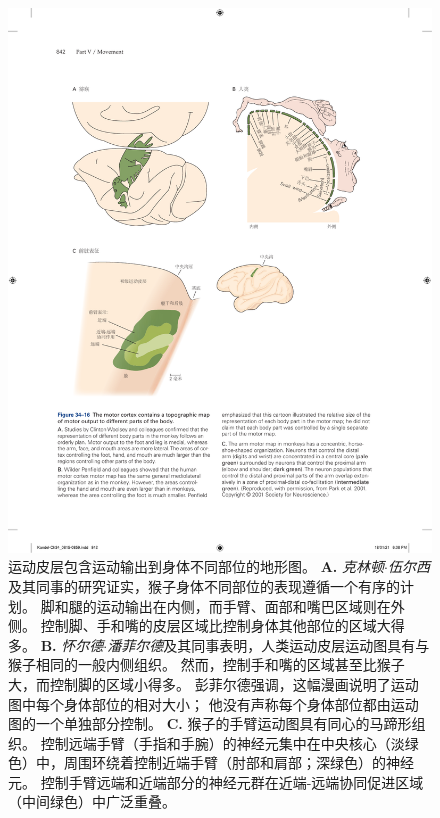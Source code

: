 \begin{figure}[htbp]
	\centering
	\includegraphics[width=1.0\linewidth]{chap34/fig_34_16}
	\caption{运动皮层包含运动输出到身体不同部位的地形图。
		\textbf{A.} \textit{克林顿$\cdot$伍尔西}及其同事的研究证实，猴子身体不同部位的表现遵循一个有序的计划。
		脚和腿的运动输出在内侧，而手臂、面部和嘴巴区域则在外侧。
		控制脚、手和嘴的皮层区域比控制身体其他部位的区域大得多。
		\textbf{B.} \textit{怀尔德$\cdot$潘菲尔德}及其同事表明，人类运动皮层运动图具有与猴子相同的一般内侧组织。
		然而，控制手和嘴的区域甚至比猴子大，而控制脚的区域小得多。
		彭菲尔德强调，这幅漫画说明了运动图中每个身体部位的相对大小；
		他没有声称每个身体部位都由运动图的一个单独部分控制。
		\textbf{C.} 猴子的手臂运动图具有同心的马蹄形组织。
		控制远端手臂（手指和手腕）的神经元集中在中央核心（淡绿色）中，周围环绕着控制近端手臂（肘部和肩部；深绿色）的神经元。
		控制手臂远端和近端部分的神经元群在近端-远端协同促进区域（中间绿色）中广泛重叠\cite{park2001consistent}。}
	\label{fig:34_16}
\end{figure}


